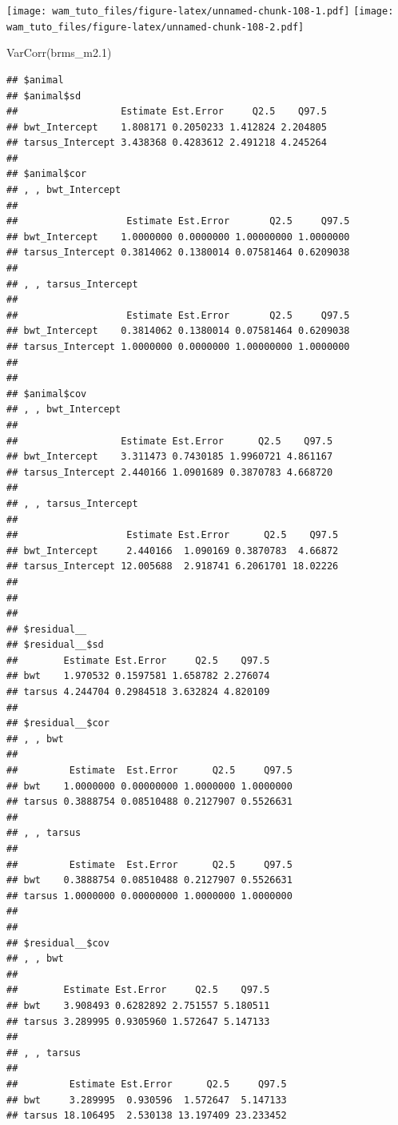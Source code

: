 \documentclass[
  12pt,
]{book}
\newenvironment{Shaded}{\begin{snugshade}}{\end{snugshade}}
\newcommand{\FloatTok}[1]{\textcolor[rgb]{0.00,0.00,0.81}{#1}}
\newcommand{\FunctionTok}[1]{\textcolor[rgb]{0.00,0.00,0.00}{#1}}
\newcommand{\NormalTok}[1]{#1}
\begin{document}
\texttt{[image: wam\_tuto\_files/figure-latex/unnamed-chunk-108-1.pdf]} \texttt{[image: wam\_tuto\_files/figure-latex/unnamed-chunk-108-2.pdf]}

\begin{Shaded}
\begin{Highlighting}[]
\FunctionTok{VarCorr}\NormalTok{(brms\_m2}\FloatTok{.1}\NormalTok{)}
\end{Highlighting}
\end{Shaded}

\begin{verbatim}
## $animal
## $animal$sd
##                  Estimate Est.Error     Q2.5    Q97.5
## bwt_Intercept    1.808171 0.2050233 1.412824 2.204805
## tarsus_Intercept 3.438368 0.4283612 2.491218 4.245264
## 
## $animal$cor
## , , bwt_Intercept
## 
##                   Estimate Est.Error       Q2.5     Q97.5
## bwt_Intercept    1.0000000 0.0000000 1.00000000 1.0000000
## tarsus_Intercept 0.3814062 0.1380014 0.07581464 0.6209038
## 
## , , tarsus_Intercept
## 
##                   Estimate Est.Error       Q2.5     Q97.5
## bwt_Intercept    0.3814062 0.1380014 0.07581464 0.6209038
## tarsus_Intercept 1.0000000 0.0000000 1.00000000 1.0000000
## 
## 
## $animal$cov
## , , bwt_Intercept
## 
##                  Estimate Est.Error      Q2.5    Q97.5
## bwt_Intercept    3.311473 0.7430185 1.9960721 4.861167
## tarsus_Intercept 2.440166 1.0901689 0.3870783 4.668720
## 
## , , tarsus_Intercept
## 
##                   Estimate Est.Error      Q2.5    Q97.5
## bwt_Intercept     2.440166  1.090169 0.3870783  4.66872
## tarsus_Intercept 12.005688  2.918741 6.2061701 18.02226
## 
## 
## 
## $residual__
## $residual__$sd
##        Estimate Est.Error     Q2.5    Q97.5
## bwt    1.970532 0.1597581 1.658782 2.276074
## tarsus 4.244704 0.2984518 3.632824 4.820109
## 
## $residual__$cor
## , , bwt
## 
##         Estimate  Est.Error      Q2.5     Q97.5
## bwt    1.0000000 0.00000000 1.0000000 1.0000000
## tarsus 0.3888754 0.08510488 0.2127907 0.5526631
## 
## , , tarsus
## 
##         Estimate  Est.Error      Q2.5     Q97.5
## bwt    0.3888754 0.08510488 0.2127907 0.5526631
## tarsus 1.0000000 0.00000000 1.0000000 1.0000000
## 
## 
## $residual__$cov
## , , bwt
## 
##        Estimate Est.Error     Q2.5    Q97.5
## bwt    3.908493 0.6282892 2.751557 5.180511
## tarsus 3.289995 0.9305960 1.572647 5.147133
## 
## , , tarsus
## 
##         Estimate Est.Error      Q2.5     Q97.5
## bwt     3.289995  0.930596  1.572647  5.147133
## tarsus 18.106495  2.530138 13.197409 23.233452
\end{verbatim}
\end{document}
